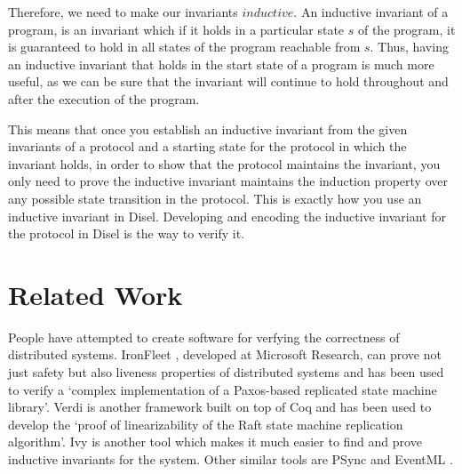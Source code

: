 Therefore, we need to make our invariants $inductive$. An inductive invariant
of a program, is an invariant which if it holds in a particular state $s$ of the
program, it is guaranteed to hold in all states of the program reachable from $s$.
Thus, having an inductive invariant that holds in the start state of a program
is much more useful, as we can be sure that the invariant will continue to
hold throughout and after the execution of the program.

This means that once you establish an inductive invariant from the given invariants
of a protocol and a starting state for the protocol in which the invariant holds,
in order to show that the protocol maintains the invariant, you only need to
prove the inductive invariant maintains the induction property over any possible state
transition in the protocol. This is exactly how you use an inductive invariant in
Disel. Developing and encoding the inductive invariant for the protocol in Disel
is the way to verify it.


\section{Related Work}
\label{sec:relatedWork}
People have attempted to create software for verfying the correctness of distributed
systems. IronFleet \cite{15}, developed at Microsoft Research, can prove not just
safety but also liveness properties of distributed systems and has been used
to verify a `complex implementation of a Paxos-based replicated state machine
library'. Verdi \cite{16} is another framework built on top of Coq and has been used
to develop the `proof of linearizability of the Raft state machine replication
algorithm'. Ivy \cite{19} is another tool which makes it much easier to find and
prove inductive invariants for the system. Other similar tools are PSync \cite{17}
and EventML \cite{18}.
